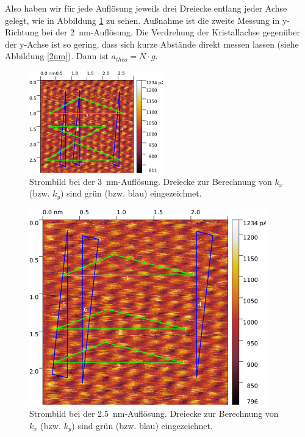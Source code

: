 Also haben wir für jede Auflösung jeweils drei Dreiecke entlang jeder Achse gelegt, wie in Abbildung \ref{3nm} zu sehen. Außnahme ist die zweite Messung in y-Richtung bei der \SI{2}{nm}-Auflösung. Die Verdrehung der Kristallachse gegenüber der y-Achse ist so gering, dass sich kurze Abstände direkt messen lassen (siehe Abbildung \ref{2nm}). Dann ist $a_{theo} = N \cdot g$.

\begin{figure}[H]
\centering
\includegraphics[width=\textwidth]{../Gwyddion/HOPG/3nm_gimped.pdf}
\caption{Strombild bei der \SI{3}{nm}-Auflösung. Dreiecke zur Berechnung von $k_x$ (bzw. $k_y$) sind grün (bzw. blau) eingezeichnet.}
\label{3nm}
\end{figure}

\begin{figure}[H]
\centering
\includegraphics[width=\textwidth]{../Gwyddion/HOPG/2,5nm_gimped.pdf}
\caption{Strombild bei der \SI{2,5}{nm}-Auflösung. Dreiecke zur Berechnung von $k_x$ (bzw. $k_y$) sind grün (bzw. blau) eingezeichnet.}
\label{2,5nm}
\end{figure}

